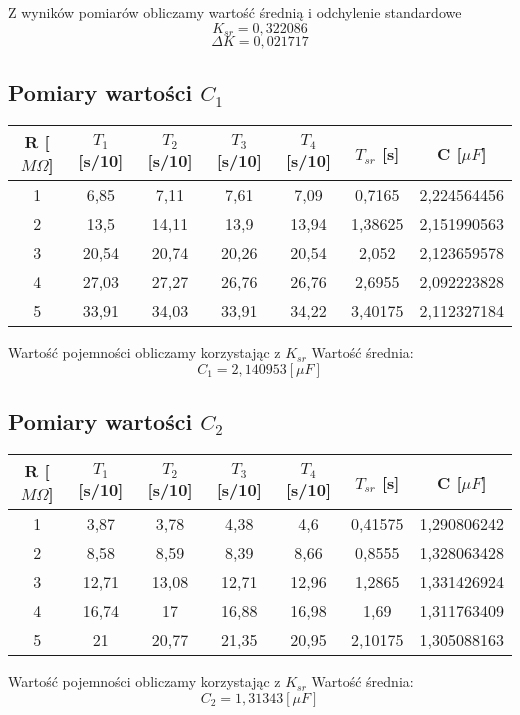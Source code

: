 \documentclass[polish,a4paper]{article}
\begin{document}
Z wyników pomiarów obliczamy wartość średnią i odchylenie standardowe
$$K_{sr} = 0,322086 $$
$$\Delta K = 0,021717 $$

\subsection{Pomiary wartości $C_1$}
\begin{table}[H]
\centering
\begin{tabular}{|c|c|c|c|c|c|c|}
\hline
R [$M\Omega$] & $T_1$ [s/10] & $T_2$ [s/10] & $T_3$ [s/10] & $T_4$ [s/10] & $T_{sr}$ [s] & C [$\mu F$] \\
\hline
1&	6,85&	7,11&	7,61&	7,09&	0,7165&	2,224564456 \\
2&	13,5&	14,11&	13,9&	13,94&	1,38625&	2,151990563 \\
3&	20,54&	20,74&	20,26&	20,54&	2,052&	2,123659578 \\
4&	27,03&	27,27&	26,76&	26,76&	2,6955&	2,092223828 \\
5&	33,91&	34,03&	33,91&	34,22&	3,40175&	2,112327184 \\

\hline
\end{tabular}
\end{table}
Wartość pojemności obliczamy korzystając z $K_{sr}$
Wartość średnia:
$$C_1 = 2,140953[\mu F]$$

\subsection{Pomiary wartości $C_2$}
\begin{table}[H]
\centering
\begin{tabular}{|c|c|c|c|c|c|c|}
\hline
R [$M\Omega$] & $T_1$ [s/10] & $T_2$ [s/10] & $T_3$ [s/10] & $T_4$ [s/10] & $T_{sr}$ [s] & C [$\mu F$] \\
\hline
1&	3,87&	3,78&	4,38&	4,6& 	0,41575&	1,290806242 \\
2&	8,58&	8,59&	8,39&	8,66&	0,8555&	1,328063428 \\
3&	12,71&	13,08&	12,71&	12,96&	1,2865&	1,331426924 \\
4&	16,74&	17& 	16,88&	16,98&	1,69&	1,311763409 \\
5&	21& 	20,77&	21,35&	20,95&	2,10175&	1,305088163 \\

\hline
\end{tabular}
\end{table}
Wartość pojemności obliczamy korzystając z $K_{sr}$
Wartość średnia:
$$C_2 = 1,31343[\mu F]$$
\end{document}
